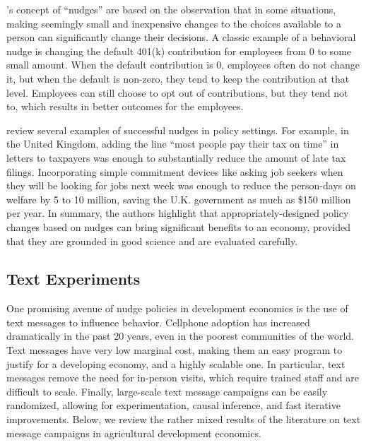 \documentclass[12pt]{article}
\begin{document}
\textcite{thaler_nudge_2009}'s concept of ``nudges'' are based on the observation that in some situations, making seemingly small and inexpensive changes to the choices available to a person can significantly change their decisions. A classic example of a behavioral nudge is changing the default 401(k) contribution for employees from 0 to some small amount. When the default contribution is 0, employees often do not change it, but when the default is non-zero, they tend to keep the contribution at that level. Employees can still choose to opt out of contributions, but they tend not to, which results in better outcomes for the employees.

\textcite{halpern_nudging_2016} review several examples of successful nudges in policy settings. For example, in the United Kingdom, adding the line ``most people pay their tax on time'' in letters to taxpayers was enough to substantially reduce the amount of late tax filings. Incorporating simple commitment devices like asking job seekers when they will be looking for jobs next week was enough to reduce the person-days on welfare by 5 to 10 million, saving the U.K. government as much as \$150 million per year. In summary, the authors highlight that appropriately-designed policy changes based on nudges can bring significant benefits to an economy, provided that they are grounded in good science and are evaluated carefully.

\subsection{Text Experiments}
One promising avenue of nudge policies in development economics is the use of text messages to influence behavior. Cellphone adoption has increased dramatically in the past 20 years, even in the poorest communities of the world. Text messages have very low marginal cost, making them an easy program to justify for a developing economy, and a highly scalable one. In particular, text messages remove the need for in-person visits, which require trained staff and are difficult to scale. Finally, large-scale text message campaigns can be easily randomized, allowing for experimentation, causal inference, and fast iterative improvements. Below, we review the rather mixed results of the literature on text message campaigns in agricultural development economics.
\end{document}
